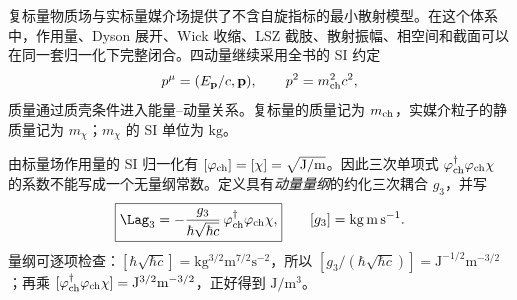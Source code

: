 
复标量物质场与实标量媒介场提供了不含自旋指标的最小散射模型。在这个体系中，作用量、Dyson 展开、Wick 收缩、LSZ 截肢、散射振幅、相空间和截面可以在同一套归一化下完整闭合。四动量继续采用全书的 SI 约定
\begin{equation*}
 p^\mu=(E_{\mathbf p}/c,\mathbf p),\qquad p^2=m_{\rm ch}^2c^2,
\end{equation*}
质量通过质壳条件进入能量--动量关系。复标量的质量记为 $m_{\rm ch}$，实媒介粒子的静质量记为 $m_\chi$；$m_\chi$ 的 SI 单位为 $\mathrm{kg}$。

由标量场作用量的 SI 归一化有 $[\varphi_{\rm ch}]=[\chi]=\sqrt{\mathrm{J/m}}$。因此三次单项式 $\varphi_{\rm ch}^\dagger\varphi_{\rm ch}\chi$ 的系数不能写成一个无量纲常数。定义具有\emph{动量量纲}的约化三次耦合 $g_3$，并写
\begin{equation}
 \boxed{
 \Lag_{3}
 =-\frac{g_3}{\hbar\sqrt{\hbar c}}\,\varphi_{\rm ch}^\dagger\varphi_{\rm ch}\chi,}
 \qquad [g_3]=\mathrm{kg\,m\,s^{-1}}.
 \label{eq:scalar-cubic-si-r10}
\end{equation}
量纲可逐项检查：$[\hbar\sqrt{\hbar c}]=\mathrm{kg^{3/2}m^{7/2}s^{-2}}$，所以 $[g_3/(\hbar\sqrt{\hbar c})]=\mathrm{J^{-1/2}m^{-3/2}}$；再乘 $[\varphi_{\rm ch}^\dagger\varphi_{\rm ch}\chi]=\mathrm{J^{3/2}m^{-3/2}}$，正好得到 $\mathrm{J/m^3}$。


